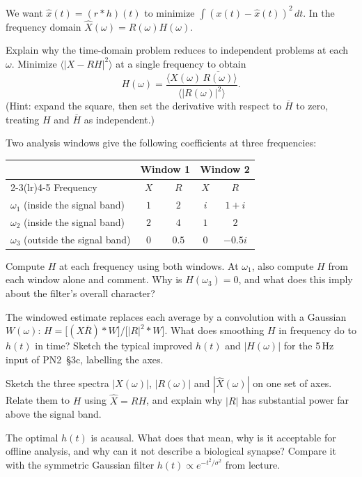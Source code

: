 \documentclass[10pt,letterpaper]{article}
\newcommand{\qsec}[1]{\vspace{8pt}{\large\bfseries #1}\par\vspace{2pt}}
\begin{document}
\qsec{4. The optimal linear filter}
We want $\hat x(t) = (r * h)(t)$ to minimize $\int (x(t) - \hat x(t))^2\,dt$. In the frequency domain $\hat X(\omega) = R(\omega)H(\omega)$.

\begin{parts}
\item[4a.] Explain why the time-domain problem reduces to independent problems at each $\omega$. Minimize $\big\langle |X - RH|^2 \big\rangle$ at a single frequency to obtain
\[
H(\omega) = \frac{\langle X(\omega)\,\overline{R(\omega)}\rangle}{\langle |R(\omega)|^2 \rangle}.
\]
(Hint: expand the square, then set the derivative with respect to $\overline{H}$ to zero, treating $H$ and $\overline{H}$ as independent.)

\item[4b.] Two analysis windows give the following coefficients at three frequencies:

\begin{center}
\begin{tabular}{lcccc}
\toprule
 & \multicolumn{2}{c}{Window 1} & \multicolumn{2}{c}{Window 2} \\
\cmidrule(lr){2-3}\cmidrule(lr){4-5}
Frequency & $X$ & $R$ & $X$ & $R$ \\
\midrule
$\omega_1$ (inside the signal band) & $1$ & $2$ & $i$ & $1+i$ \\
$\omega_2$ (inside the signal band) & $2$ & $4$ & $1$ & $2$ \\
$\omega_3$ (outside the signal band) & $0$ & $0.5$ & $0$ & $-0.5i$ \\
\bottomrule
\end{tabular}
\end{center}

Compute $H$ at each frequency using both windows. At $\omega_1$, also compute $H$ from each window alone and comment. Why is $H(\omega_3) = 0$, and what does this imply about the filter's overall character?

\item[4c.] The windowed estimate replaces each average by a convolution with a Gaussian $W(\omega)$: $H = \big[(X\overline{R}) * W\big] / \big[|R|^2 * W\big]$. What does smoothing $H$ in frequency do to $h(t)$ in time? Sketch the typical improved $h(t)$ and $|H(\omega)|$ for the 5\,Hz input of PN2~\S3c, labelling the axes.

\item[4d.] Sketch the three spectra $|X(\omega)|$, $|R(\omega)|$ and $|\hat X(\omega)|$ on one set of axes. Relate them to $H$ using $\hat X = RH$, and explain why $|R|$ has substantial power far above the signal band.

\item[4e.] The optimal $h(t)$ is acausal. What does that mean, why is it acceptable for offline analysis, and why can it not describe a biological synapse? Compare it with the symmetric Gaussian filter $h(t) \propto e^{-t^2/\sigma^2}$ from lecture.
\end{parts}
\end{document}
